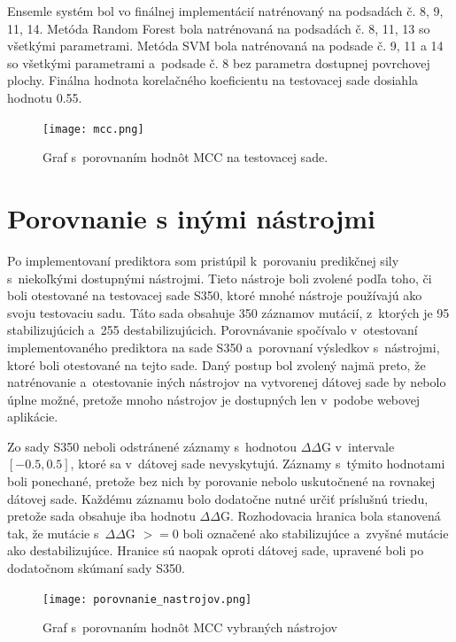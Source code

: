 Ensemle systém bol vo finálnej implementácií natrénovaný na podsadách č. 8, 9, 11, 14. Metóda Random Forest bola natrénovaná na podsadách č. 8, 11, 13 so všetkými parametrami. Metóda SVM bola natrénovaná na podsade č. 9, 11 a 14 so všetkými parametrami a~podsade č. 8 bez parametra dostupnej povrchovej plochy. Finálna hodnota korelačného koeficientu na testovacej sade dosiahla hodnotu 0.55. 

\begin{figure}[H]
	\centering
	\begin{center}
		\scalebox{0.6}
		{   
			\texttt{[image: mcc.png]}
		}
		\caption{Graf s~porovnaním hodnôt MCC na testovacej sade.}
	\end{center}
\end{figure}

\section{Porovnanie s inými nástrojmi}

Po implementovaní prediktora som pristúpil k~porovaniu predikčnej sily s~niekoľkými dostupnými nástrojmi. Tieto nástroje boli zvolené podľa toho, či boli otestované na testovacej sade S350, ktoré mnohé nástroje používajú ako svoju testovaciu sadu. Táto sada obsahuje 350 záznamov mutácií, z~ktorých je 95 stabilizujúcich a~255 destabilizujúcich. 
Porovnávanie spočívalo v~otestovaní implementovaného prediktora na sade S350 a~porovnaní výsledkov s~nástrojmi, ktoré boli otestované na tejto sade. Daný postup bol zvolený najmä preto, že natrénovanie a~otestovanie iných nástrojov na vytvorenej dátovej sade by nebolo úplne možné, pretože mnoho nástrojov je dostupných len v~podobe webovej aplikácie.

Zo sady S350 neboli odstránené záznamy s~hodnotou $\Delta\Delta$G v~intervale $\left[-0.5,0.5\right]$, ktoré sa v~dátovej sade nevyskytujú. Záznamy s~týmito hodnotami boli ponechané, pretože bez nich by porovanie nebolo uskutočnené na rovnakej dátovej sade. Každému záznamu bolo dodatočne nutné určiť príslušnú triedu, pretože sada obsahuje iba hodnotu $\Delta\Delta$G. Rozhodovacia hranica bola stanovená tak, že mutácie s~$\Delta\Delta$G $>= 0$ boli označené ako stabilizujúce a~zvyšné mutácie ako destabilizujúce. Hranice sú naopak oproti dátovej sade, upravené boli po dodatočnom skúmaní sady S350. 


\begin{figure}[H]
	\centering
	\begin{center}
		\scalebox{0.7}
		{   
			\texttt{[image: porovnanie\_nastrojov.png]}
		}
		\caption{Graf s~porovnaním hodnôt MCC vybraných nástrojov}
		\label{porovnanie}
	\end{center}
\end{figure}

